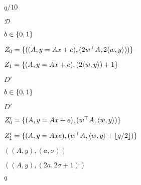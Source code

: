 \documentclass[10pt]{book}
\begin{document}
\begin{mdSnippets}
\begin{mdInlineSnippet}[f6e7f5f346640cf1cd084f1fb4f45491]
$q/10$\end{mdInlineSnippet}%
\begin{mdInlineSnippet}%
$\mathcal{D}$\end{mdInlineSnippet}%
\begin{mdInlineSnippet}[6892f7e7c3b8ecc19e4a077e82515567]%
$b \in \{0,1\}$\end{mdInlineSnippet}%
\begin{mdInlineSnippet}%
$Z_0 = \{((A,y = Ax + e),(2w^\top A, 2\langle w,y \rangle)) \}$\end{mdInlineSnippet}%
\begin{mdInlineSnippet}[d5325612fc5c024def13fd5b03ad6f24]%
$Z_1 = \{(A, y = Ax + e),(2 \langle w,y \rangle) + 1 \}$\end{mdInlineSnippet}%
\begin{mdInlineSnippet}[0232f27be40b2b647f260050dd308eb8]%
$D'$\end{mdInlineSnippet}%
\begin{mdInlineSnippet}[6892f7e7c3b8ecc19e4a077e82515567]%
$b \in \{0,1\}$\end{mdInlineSnippet}%
\begin{mdInlineSnippet}[0232f27be40b2b647f260050dd308eb8]%
$D'$\end{mdInlineSnippet}%
\begin{mdInlineSnippet}[fa8f30df309fb868491817afa9e2b492]%
$Z_0' = \{(A,y= Ax + e),(w^{\top}A, \langle w,y \rangle) \}$\end{mdInlineSnippet}%
\begin{mdInlineSnippet}%
$Z_1' = \{(A, y = Ax e),(w^\top A, \langle w,y \rangle + \lfloor q/2 \rfloor) \}$\end{mdInlineSnippet}%
\begin{mdInlineSnippet}[44b7cb8db2afad00a6f188240f5cb5c2]%
$((A,y),(a,\sigma))$\end{mdInlineSnippet}%
\begin{mdInlineSnippet}[b11506a3878b284e9734b0b320d2258d]%
$((A,y), (2a, 2\sigma + 1))$\end{mdInlineSnippet}%
\begin{mdInlineSnippet}[7694f4a66316e53c8cdd9d9954bd611d]%
$q$\end{mdInlineSnippet}%

\end{mdSnippets}
\end{document}

